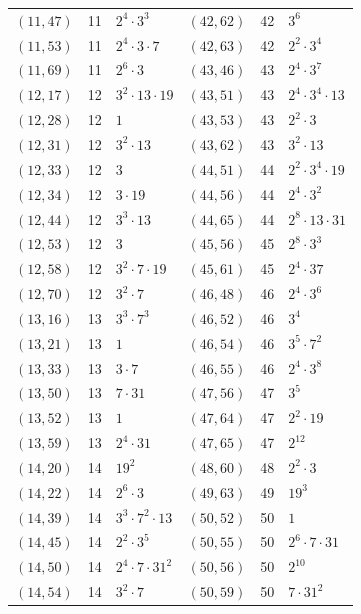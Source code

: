 \documentclass[11pt]{article}
\begin{document}
\begin{longtable}{@{}lrl@{\qquad}lrl@{}}
$(11,47)$ & 11 & $2^{4}\cdot 3^{3}$ & $(42,62)$ & 42 & $3^{6}$\\
$(11,53)$ & 11 & $2^{4}\cdot 3\cdot 7$ & $(42,63)$ & 42 & $2^{2}\cdot 3^{4}$\\
$(11,69)$ & 11 & $2^{6}\cdot 3$ & $(43,46)$ & 43 & $2^{4}\cdot 3^{7}$\\
$(12,17)$ & 12 & $3^{2}\cdot 13\cdot 19$ & $(43,51)$ & 43 & $2^{4}\cdot 3^{4}\cdot 13$\\
$(12,28)$ & 12 & $1$ & $(43,53)$ & 43 & $2^{2}\cdot 3$\\
$(12,31)$ & 12 & $3^{2}\cdot 13$ & $(43,62)$ & 43 & $3^{2}\cdot 13$\\
$(12,33)$ & 12 & $3$ & $(44,51)$ & 44 & $2^{2}\cdot 3^{4}\cdot 19$\\
$(12,34)$ & 12 & $3\cdot 19$ & $(44,56)$ & 44 & $2^{4}\cdot 3^{2}$\\
$(12,44)$ & 12 & $3^{3}\cdot 13$ & $(44,65)$ & 44 & $2^{8}\cdot 13\cdot 31$\\
$(12,53)$ & 12 & $3$ & $(45,56)$ & 45 & $2^{8}\cdot 3^{3}$\\
$(12,58)$ & 12 & $3^{2}\cdot 7\cdot 19$ & $(45,61)$ & 45 & $2^{4}\cdot 37$\\
$(12,70)$ & 12 & $3^{2}\cdot 7$ & $(46,48)$ & 46 & $2^{4}\cdot 3^{6}$\\
$(13,16)$ & 13 & $3^{3}\cdot 7^{3}$ & $(46,52)$ & 46 & $3^{4}$\\
$(13,21)$ & 13 & $1$ & $(46,54)$ & 46 & $3^{5}\cdot 7^{2}$\\
$(13,33)$ & 13 & $3\cdot 7$ & $(46,55)$ & 46 & $2^{4}\cdot 3^{8}$\\
$(13,50)$ & 13 & $7\cdot 31$ & $(47,56)$ & 47 & $3^{5}$\\
$(13,52)$ & 13 & $1$ & $(47,64)$ & 47 & $2^{2}\cdot 19$\\
$(13,59)$ & 13 & $2^{4}\cdot 31$ & $(47,65)$ & 47 & $2^{12}$\\
$(14,20)$ & 14 & $19^{2}$ & $(48,60)$ & 48 & $2^{2}\cdot 3$\\
$(14,22)$ & 14 & $2^{6}\cdot 3$ & $(49,63)$ & 49 & $19^{3}$\\
$(14,39)$ & 14 & $3^{3}\cdot 7^{2}\cdot 13$ & $(50,52)$ & 50 & $1$\\
$(14,45)$ & 14 & $2^{2}\cdot 3^{5}$ & $(50,55)$ & 50 & $2^{6}\cdot 7\cdot 31$\\
$(14,50)$ & 14 & $2^{4}\cdot 7\cdot 31^{2}$ & $(50,56)$ & 50 & $2^{10}$\\
$(14,54)$ & 14 & $3^{2}\cdot 7$ & $(50,59)$ & 50 & $7\cdot 31^{2}$\\

\end{longtable}
\end{document}
